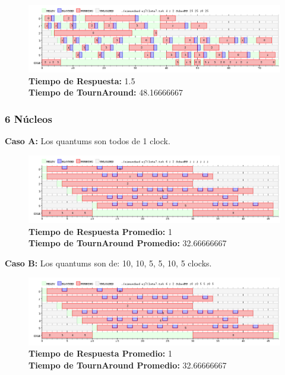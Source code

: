 \documentclass[a4paper]{article}
\begin{document}
			 \begin{figure}[h!]
   \begin{center}
 	\includegraphics[scale=0.5]{imagenes/ej7/4nucleoC.png}
 	\textbf{Tiempo de Respuesta:} 1.5 \\
 	\textbf{Tiempo de TournAround:} 48.16666667 \\
   \end{center}
 \end{figure} 
 
 \newpage
	\subsubsection*{6 N\'ucleos}
	
	\textbf{Caso A:}  Los quantums son todos de 1 clock.

		 \begin{figure}[h!]
   \begin{center}
 	\includegraphics[scale=0.5]{imagenes/ej7/6nucleoA.png}
 	\textbf{Tiempo de Respuesta Promedio:} 1 \\
 	\textbf{Tiempo de TournAround Promedio:} 32.66666667 \\
   \end{center}
 \end{figure} 
 	
	\textbf{Caso B:}  Los quantums son de: 10, 10, 5, 5, 10, 5 clocks.
	
			 \begin{figure}[h!]
   \begin{center}
 	\includegraphics[scale=0.5]{imagenes/ej7/6nucleoB.png}
 	\textbf{Tiempo de Respuesta Promedio:} 1 \\
 	\textbf{Tiempo de TournAround Promedio:} 32.66666667 \\
   \end{center}
 \end{figure} 
 
\end{document}
